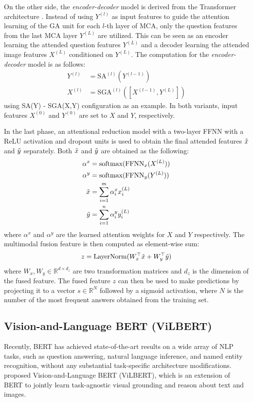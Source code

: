 \documentclass{article}
\begin{document}
On the other side, the \textit{encoder-decoder} model is derived from the Transformer architecture \citep{transformers}. Instead of using $Y^{(l)}$ as input features to guide the attention learning of the GA unit for each $l$-th layer of MCA, only the question features from the last MCA layer $Y^{(L)}$ are utilized. This can be seen as an encoder learning the attended question features $Y^{(L)}$ and a decoder learning the attended image features $X^{(L)}$ conditioned on $Y^{(L)}$. The computation for the \textit{encoder-decoder} model is as follows:
\begin{align}
    Y^{(l)} &= \text{SA}^{(l)}(Y^{(l-1)}) \\
    X^{(l)} &= \text{SGA}^{(l)}([X^{(l-1)}, Y^{(L)}])
\end{align}
using SA(Y) - SGA(X,Y) configuration as an example. In both variants, input features $X^{(0)}$ and $Y^{(0)} $ are set to $X$ and $Y$, respectively.

In the last phase, an attentional reduction model with a two-layer FFNN with a ReLU activation and dropout units is used to obtain the final attended features $\Tilde{x}$ and $\Tilde{y}$ separately. Both $\Tilde{x}$ and $\Tilde{y}$ are obtained as the following:
\begin{align}
    \alpha^{x} &= \text{softmax}(\text{FFNN}_{x}(X^{(L)})) \\
    \alpha^{y} &= \text{softmax}(\text{FFNN}_{y}(Y^{(L)})) \\
    \Tilde{x} &= \sum_{i=1}^{m}\alpha^{x}_{i}x^{(L)}_{i}  \label{eq_mcan_att} \\ 
     \Tilde{y} &= \sum_{i=1}^{n}\alpha^{y}_{i}y^{(L)}_{i}
\end{align}
where $\alpha^{x}$ and $\alpha^{y}$ are the learned attention weights for $X$ and $Y$ respectively. The multimodal fusion feature is then computed as element-wise sum:
\begin{align}
    z = \text{LayerNorm}(W^{\top}_{x}\Tilde{x} + W^{\top}_{y}\Tilde{y})
\end{align}
where $W_{x}, W_{y} \in \mathbb{R}^{d \times d_{z}}$ are two transformation matrices and $d_{z}$ is the dimension of the fused feature. The fused feature $z$ can then be used to make predictions by projecting it to a vector $s \in \mathbb{R}^{N}$ followed by a sigmoid activation, where $N$ is the number of the most frequent answers obtained from the training set.

\subsection{Vision-and-Language BERT (ViLBERT)} \label{subsection:vilbert}
Recently, BERT \citep{devlin-etal-2019-bert} has achieved state-of-the-art results on a wide array of NLP tasks, such as question answering, natural language inference, and named entity recognition, without any substantial task-specific architecture modifications. \citet{lu2019vilbert} proposed Vision-and-Language BERT (ViLBERT), which is an extension of BERT to jointly learn task-agnostic visual grounding and reason about text and images. 
\end{document}
